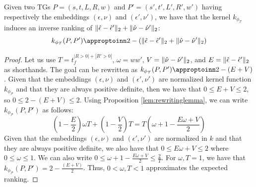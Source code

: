 \begin{lemma}\label{lem:approxRank}
	Given two TGs $P=(s,t,L,R,w)$ and $P'=(s',t',L',R',w')$ having respectively the embeddings $(\epsilon,\nu)$ and $(\epsilon',\nu')$, we have that the kernel $k_{\phi_{\mathcal{T}}}$ induces an inverse ranking of $\|\hat{\epsilon}-\hat{\epsilon}'\|_{2}+\|\hat{\nu}-\hat{\nu}'\|_{2}$:
	$$k_{\phi_{\mathcal{T}}}(P,P')\appropto 2-(\norm{\hat{\epsilon}-\hat{\epsilon}'}{2}+\norm{\hat{\nu}-\hat{\nu}'}{2})$$
\end{lemma}
\begin{proof}
	Let us use $T=t_f^{|R>0|+|R'>0|}$, $\omega=ww'$, $V=\|\hat{\nu}-\hat{\nu}'\|_{2}$, and $E=\|\hat{\epsilon}-\hat{\epsilon}'\|_{2}$ as shorthands. The goal can be rewritten as $k_{\phi_{\mathcal{T}}}(P,P')\appropto 2-(E+V)$. Given that the embeddings $(\epsilon,\nu)$ and $(\epsilon',\nu')$ are normalized kernel function $k_{\phi_{\mathcal{P}}}$ and that they are always positive definite, then we have that $0\leq E +V\leq 2$, so $0\leq 2-(E+V)\leq 2$. Using Proposition \ref{lem:rewritinglemma}, we can write $k_{\phi_{\mathcal{P}}}(P,P')$ as follows:
	$$\left(1-\frac{E}{2}\right)\omega T+\left(1-\frac{V}{2}\right)T=T\left(\omega+1-\frac{E\omega+V}{2}\right)$$
	Given that the embeddings $(\epsilon,\nu)$ and $(\epsilon',\nu')$ are normalized in $k$ and that they are always positive definite,  we also have that $0\leq E\omega +V\leq 2$ where $0\leq \omega\leq 1$. We can also write  $0\leq \omega+1-\frac{E\omega+V}{2}\leq \frac{2}{T}$. For $\omega,T=1$, we have that $k_{\phi_{\mathcal{P}}}(P,P')=2-\frac{(E+V)}{2}$. Thus, $0<\omega,T<1$ approximates the expected ranking. 
\end{proof}

